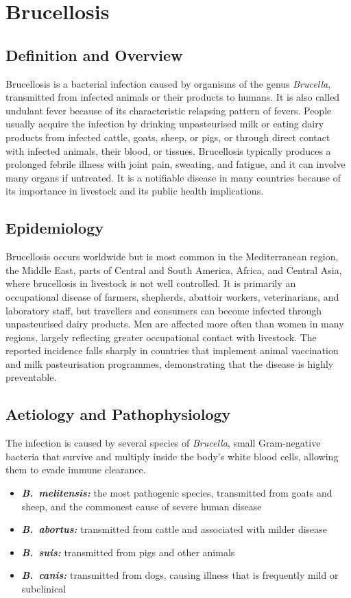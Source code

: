 \chapter{Brucellosis}

\section*{Definition and Overview}
Brucellosis is a bacterial infection caused by organisms of the genus \textit{Brucella}, transmitted from infected animals or their products to humans. It is also called undulant fever because of its characteristic relapsing pattern of fevers. People usually acquire the infection by drinking unpasteurised milk or eating dairy products from infected cattle, goats, sheep, or pigs, or through direct contact with infected animals, their blood, or tissues. Brucellosis typically produces a prolonged febrile illness with joint pain, sweating, and fatigue, and it can involve many organs if untreated. It is a notifiable disease in many countries because of its importance in livestock and its public health implications.

\section*{Epidemiology}
Brucellosis occurs worldwide but is most common in the Mediterranean region, the Middle East, parts of Central and South America, Africa, and Central Asia, where brucellosis in livestock is not well controlled. It is primarily an occupational disease of farmers, shepherds, abattoir workers, veterinarians, and laboratory staff, but travellers and consumers can become infected through unpasteurised dairy products. Men are affected more often than women in many regions, largely reflecting greater occupational contact with livestock. The reported incidence falls sharply in countries that implement animal vaccination and milk pasteurisation programmes, demonstrating that the disease is highly preventable.

\section*{Aetiology and Pathophysiology}
The infection is caused by several species of \textit{Brucella}, small Gram-negative bacteria that survive and multiply inside the body's white blood cells, allowing them to evade immune clearance.

\begin{itemize}
    \item \textbf{\textit{B.~melitensis:}} the most pathogenic species, transmitted from goats and sheep, and the commonest cause of severe human disease
    \item \textbf{\textit{B.~abortus:}} transmitted from cattle and associated with milder disease
    \item \textbf{\textit{B.~suis:}} transmitted from pigs and other animals
    \item \textbf{\textit{B.~canis:}} transmitted from dogs, causing illness that is frequently mild or subclinical
\end{itemize}


